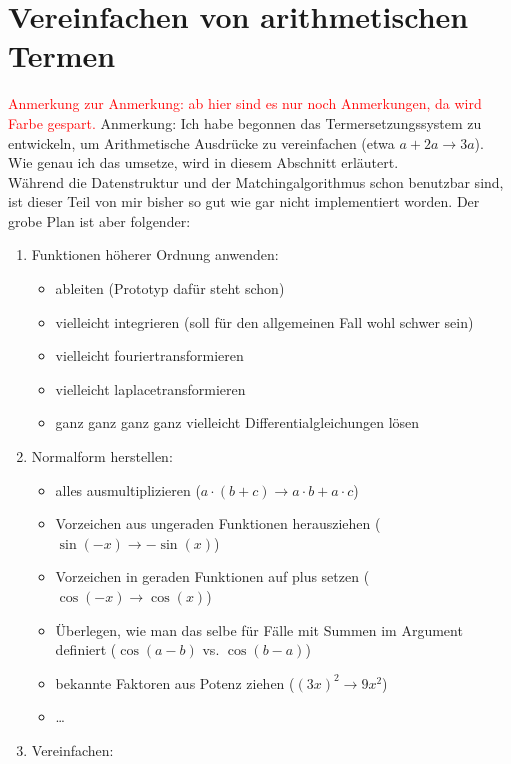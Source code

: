 \documentclass{scrartcl}
\begin{document}
\section{Vereinfachen von arithmetischen Termen}
\begin{itshape}
\textcolor{red} {Anmerkung zur Anmerkung: ab hier sind es nur noch Anmerkungen, da wird Farbe gespart.}
Anmerkung: Ich habe begonnen das Termersetzungssystem zu entwickeln, um Arithmetische Ausdrücke zu vereinfachen (etwa $a + 2 a \rightarrow 3 a$). Wie genau ich das umsetze, wird in diesem Abschnitt erläutert.
\\Während die Datenstruktur und der Matchingalgorithmus schon benutzbar sind, ist dieser Teil von mir bisher so gut wie gar nicht implementiert worden. Der grobe Plan ist aber folgender:
\begin{enumerate}
    \item Funktionen höherer Ordnung anwenden:
    \begin{itemize}
        \item ableiten (Prototyp dafür steht schon)
        \item vielleicht integrieren (soll für den allgemeinen Fall wohl schwer sein)
        \item vielleicht fouriertransformieren
        \item vielleicht laplacetransformieren
        \item ganz ganz ganz ganz vielleicht Differentialgleichungen lösen
    \end{itemize}
    \item Normalform herstellen:
    \begin{itemize}
        \item alles ausmultiplizieren ($a\cdot (b + c) \rightarrow a\cdot b + a\cdot c$)
        \item Vorzeichen aus ungeraden Funktionen herausziehen ($\sin(-x) \rightarrow -\sin(x)$)
        \item Vorzeichen in geraden Funktionen auf plus setzen ($\cos(-x) \rightarrow \cos(x)$)
        \item Überlegen, wie man das selbe für Fälle mit Summen im Argument definiert ($\cos(a - b)$ vs. $\cos(b - a)$)
        \item bekannte Faktoren aus Potenz ziehen ($(3 x)^2 \rightarrow 9 x^2$)
        \item \dots
    \end{itemize}
    \item Vereinfachen:
    \begin{itemize}

\end{itemize}
\end{enumerate}
\end{itshape}
\end{document}
